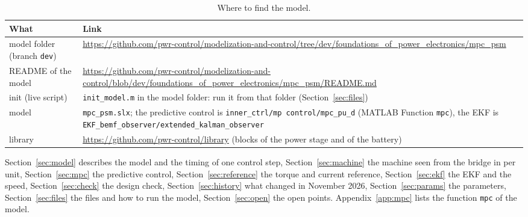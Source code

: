 \documentclass[11pt,a4paper]{scrartcl}
\newcommand{\code}[1]{\texttt{#1}}
\begin{document}
\begin{onehalfspace}
\begin{table}[H]
	\centering
	\footnotesize
	\caption{Where to find the model.}
	\label{tab:links}
	\begin{tabularx}{\textwidth}{@{} l X @{}}
		\toprule
		\textbf{What} & \textbf{Link} \\
		\midrule
		model folder (branch \code{dev}) & \url{https://github.com/pwr-control/modelization-and-control/tree/dev/foundations_of_power_electronics/mpc_psm} \\
		README of the model & \url{https://github.com/pwr-control/modelization-and-control/blob/dev/foundations_of_power_electronics/mpc_psm/README.md} \\
		init (live script) & \code{init\_model.m} in the model folder: run it from that folder (Section~\ref{sec:files}) \\
		model & \code{mpc\_psm.slx}; the predictive control is \code{inner\_ctrl/mp control/mpc\_pu\_d} (MATLAB Function \code{mpc}), the EKF is \code{EKF\_bemf\_observer/extended\_kalman\_observer} \\
		library & \url{https://github.com/pwr-control/library} (blocks of the power stage and of the battery) \\
		\bottomrule
	\end{tabularx}
\end{table}

Section~\ref{sec:model} describes the model and the timing of one control step, Section~\ref{sec:machine} the machine seen from the bridge in per unit, Section~\ref{sec:mpc} the predictive control, Section~\ref{sec:reference} the torque and current reference, Section~\ref{sec:ekf} the EKF and the speed, Section~\ref{sec:check} the design check, Section~\ref{sec:history} what changed in November 2026, Section~\ref{sec:params} the parameters, Section~\ref{sec:files} the files and how to run the model, Section~\ref{sec:open} the open points. Appendix~\ref{app:mpc} lists the function \code{mpc} of the model.


\end{onehalfspace}
\end{document}
